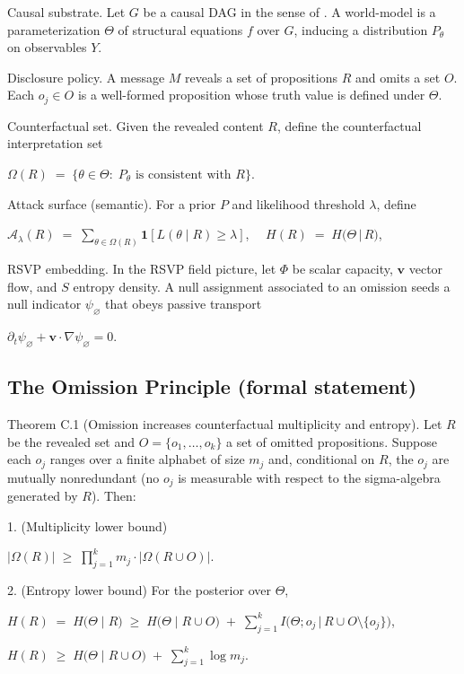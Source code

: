 \documentclass{article}
\begin{document}
Causal substrate. Let $G$ be a causal DAG in the sense of \citet{Pearl2009}. A world-model is a parameterization $\Theta$ of structural equations $f$ over $G$, inducing a distribution $P_\theta$ on observables $Y$.

Disclosure policy. A message $M$ reveals a set of propositions $R$ and omits a set $O$. Each $o_j \in O$ is a well-formed proposition whose truth value is defined under $\Theta$.

Counterfactual set. Given the revealed content $R$, define the counterfactual interpretation set

$\Omega(R)\;=\;\{\theta\in\Theta:\; P_\theta \text{ is consistent with }R\}$.

Attack surface (semantic). For a prior $P$ and likelihood threshold $\lambda$, define

$\mathcal{A}_\lambda(R)\;=\;\sum_{\theta\in\Omega(R)}\mathbf{1}\!\left[L(\theta\mid R)\ge \lambda\right]$,
$\quad
H(R)\;=\;H\big(\Theta\,\big|\,R\big)$,

RSVP embedding. In the RSVP field picture, let $\Phi$ be scalar capacity, $\mathbf{v}$ vector flow, and $S$ entropy density. A null assignment associated to an omission seeds a null indicator $\psi_{\varnothing}$ that obeys passive transport

$\partial_t \psi_{\varnothing}+\mathbf v\cdot\nabla\psi_{\varnothing}=0$.

\subsection{The Omission Principle (formal statement)}

Theorem C.1 (Omission increases counterfactual multiplicity and entropy).
Let $R$ be the revealed set and $O=\{o_1,\dots,o_k\}$ a set of omitted propositions. Suppose each $o_j$ ranges over a finite alphabet of size $m_j$ and, conditional on $R$, the $o_j$ are mutually nonredundant (no $o_j$ is measurable with respect to the sigma-algebra generated by $R$). Then:

1. (Multiplicity lower bound)

$\big|\Omega(R)\big| \;\ge\; \prod_{j=1}^k m_j \cdot \big|\Omega(R\cup O)\big|$.

2. (Entropy lower bound) For the posterior over $\Theta$,

$H(R)\;=\;H\big(\Theta\mid R\big) \;\ge\; H\big(\Theta\mid R\cup O\big)\;+\;\sum_{j=1}^k I\big(\Theta; o_j \,\big|\, R\cup O\setminus\{o_j\}\big)$,

$H(R)\;\ge\;H\big(\Theta\mid R\cup O\big)\;+\;\sum_{j=1}^k \log m_j $.
\end{document}

